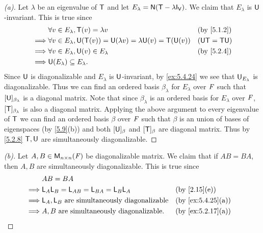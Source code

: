 \begin{proof}[(a)]
	Let \(\lambda\) be an eigenvalue of \(\mathsf{T}\) and let \(E_{\lambda} = \ns{\T - \lambda \IT[\V]}\).
	We claim that \(E_{\lambda}\) is \(\mathsf{U}\)-invariant.
	This is true since
	\begin{align*}
		         & \forall v \in E_{\lambda}, \T(v) = \lambda v                                     &  & \by{5.1.2}      \\
		\implies & \forall v \in E_{\lambda}, \U(\T(v)) = \U(\lambda v) = \lambda \U(v) = \T(\U(v)) &  & (\U \T = \T \U) \\
		\implies & \forall v \in E_{\lambda}, \U(v) \in E_{\lambda}                                 &  & \by{5.2.4}      \\
		\implies & \U(E_{\lambda}) \subseteq E_{\lambda}.
	\end{align*}
	Since \(\mathsf{U}\) is diagonalizable and \(E_{\lambda}\) is \(\mathsf{U}\)-invariant, by \cref{ex:5.4.24} we see that \(\mathsf{U}_{E_{\lambda}}\) is diagonalizable.
	Thus we can find an ordered basis \(\beta_{\lambda}\) for \(E_{\lambda}\) over \(\mathit{F}\) such that \([\mathsf{U}]_{\beta_{\lambda}}\) is a diagonal matrix.
	Note that since \(\beta_{\lambda}\) is an ordered basis for \(E_{\lambda}\) over \(\mathit{F}\), \([\mathsf{T}]_{\beta_{\lambda}}\) is also a diagonal matrix.
	Applying the above argument to every eigenvalue of \(\mathsf{T}\) we can find an ordered basis \(\beta\) over \(\mathit{F}\) such that \(\beta\) is an union of bases of eigenspaces (by \cref{5.9}(b)) and both \([\mathsf{U}]_{\beta}\) and \([\mathsf{T}]_{\beta}\) are diagonal matrix.
	Thus by \cref{5.2.8} \(\mathsf{T}, \mathsf{U}\) are simultaneously diagonalizable.
\end{proof}

\begin{proof}[(b)]
	Let \(A, B \in \ms[n][n][\F]\) be diagonalizable matrix.
	We claim that if \(AB = BA\), then \(A, B\) are simultaneously diagonalizable.
	This is true since
	\begin{align*}
		         & AB = BA                                                                     \\
		\implies & \L_A \L_B = \L_{AB} = \L_{BA} = \L_B \L_A            &  & \by{2.15}[e]      \\
		\implies & \L_A, \L_B \text{ are simultaneously diagonalizable} &  & \by{ex:5.4.25}[a] \\
		\implies & A, B \text{ are simultaneously diagonalizable}.      &  & \by{ex:5.2.17}[a]
	\end{align*}
\end{proof}

